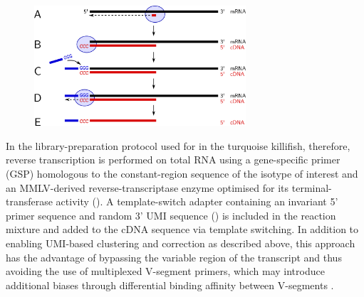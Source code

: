 \begin{figure}
\centering
\includegraphics[width=0.7\textwidth]{_Figures/png_edited/template-switch-labelled}
\vspace{0.5em}
\label{fig:template-switch-schema}
\end{figure}

In the library-preparation protocol used for \Igseq in the turquoise killifish, therefore, reverse transcription is performed on total RNA using a gene-specific primer (GSP) homologous to the constant-region sequence of the isotype of interest and an MMLV-derived reverse-transcriptase enzyme optimised for its terminal-transferase activity (). A template-switch adapter containing an invariant 5' primer sequence and random 3' UMI sequence () is included in the reaction mixture and added to the cDNA sequence via template switching. In addition to enabling UMI-based clustering and correction as described above, this approach has the advantage of bypassing the variable region of the \igh{} transcript and thus avoiding the use of multiplexed V-segment primers, which may introduce additional biases through differential binding affinity between V-segments \parencite{rosati2017methods}.

